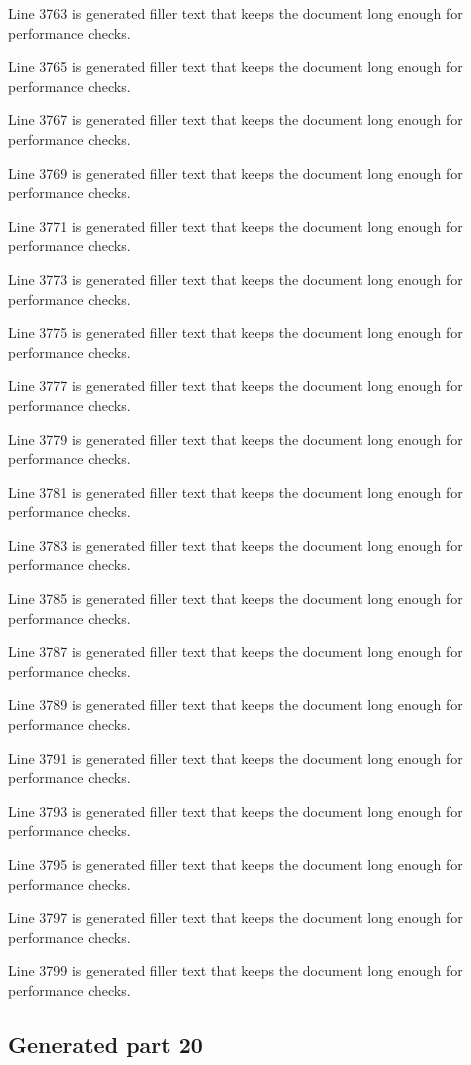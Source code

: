 Line 3763 is generated filler text that keeps the document long enough for performance checks.

Line 3765 is generated filler text that keeps the document long enough for performance checks.

Line 3767 is generated filler text that keeps the document long enough for performance checks.

Line 3769 is generated filler text that keeps the document long enough for performance checks.

Line 3771 is generated filler text that keeps the document long enough for performance checks.

Line 3773 is generated filler text that keeps the document long enough for performance checks.

Line 3775 is generated filler text that keeps the document long enough for performance checks.

Line 3777 is generated filler text that keeps the document long enough for performance checks.

Line 3779 is generated filler text that keeps the document long enough for performance checks.

Line 3781 is generated filler text that keeps the document long enough for performance checks.

Line 3783 is generated filler text that keeps the document long enough for performance checks.

Line 3785 is generated filler text that keeps the document long enough for performance checks.

Line 3787 is generated filler text that keeps the document long enough for performance checks.

Line 3789 is generated filler text that keeps the document long enough for performance checks.

Line 3791 is generated filler text that keeps the document long enough for performance checks.

Line 3793 is generated filler text that keeps the document long enough for performance checks.

Line 3795 is generated filler text that keeps the document long enough for performance checks.

Line 3797 is generated filler text that keeps the document long enough for performance checks.

Line 3799 is generated filler text that keeps the document long enough for performance checks.

\subsection{Generated part 20}

